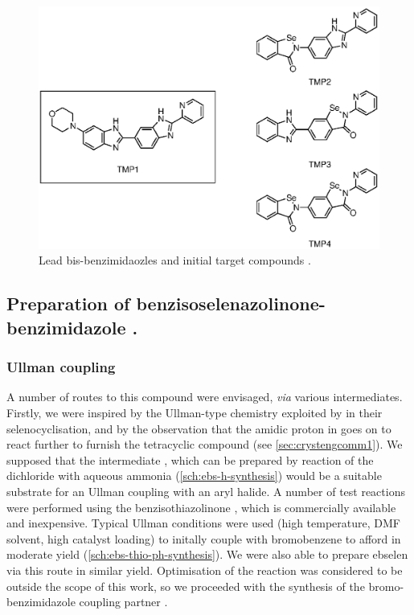 \begin{refsection}
\begin{figure}
    \centering
    \includegraphics[scale=0.74]{Figures/targets.eps}
    \caption{Lead bis-benzimidaozles  and initial target compounds .}
    \label{fig:targets}
\end{figure}

\subsection{Preparation of benzisoselenazolinone-benzimidazole .}

\subsubsection{Ullman coupling}
A number of routes to this compound were envisaged, \emph{via} various intermediates.
Firstly, we were inspired by the Ullman-type chemistry exploited by \citeauthor{Bhabak2010} in their selenocyclisation, and by the observation that the amidic proton in  goes on to react further to furnish the tetracyclic compound  (see \cref{sec:crystengcomm1})\autocite{Bhabak2010,Fellowes2017}.
We supposed that the intermediate , which can be prepared by reaction of the dichloride  with aqueous ammonia (\cref{sch:ebs-h-synthesis}) would be a suitable substrate for an Ullman coupling with an aryl halide.
A number of test reactions were performed using the benzisothiazolinone , which is commercially available and inexpensive.
Typical Ullman conditions were used (high temperature, DMF solvent, high  catalyst loading) to initally couple  with bromobenzene to afford  in moderate yield (\cref{sch:ebs-thio-ph-synthesis}).
We were also able to prepare ebselen  via this route in similar yield.
Optimisation of the reaction was considered to be outside the scope of this work, so we proceeded with the synthesis of the bromo-benzimidazole coupling partner .


\end{refsection}
